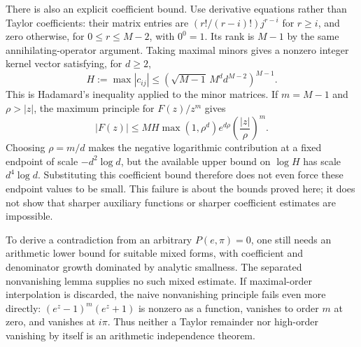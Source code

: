 \documentclass[11pt,a4paper]{article}
\numberwithin{equation}{section}
\begin{document}
There is also an explicit coefficient bound. Use derivative equations
rather than Taylor coefficients: their matrix entries are
$(r!/(r-i)!)j^{r-i}$ for $r\ge i$, and zero otherwise, for
$0\le r\le M-2$, with $0^0=1$. Its rank is $M-1$ by the same
annihilating-operator argument. Taking maximal minors gives a nonzero
integer kernel vector satisfying, for $d\ge2$,
\begin{equation}
 H:=\max|c_{ij}|
 \le\left(\sqrt{M-1}\,M^d d^{M-2}\right)^{M-1}.
\end{equation}
This is Hadamard's inequality applied to the minor matrices. If
$m=M-1$ and $\rho>|z|$, the maximum principle for $F(z)/z^m$ gives
\begin{equation}
 |F(z)|\le M H\max(1,\rho^d)e^{d\rho}
                   \left(\frac{|z|}{\rho}\right)^m.
\end{equation}
Choosing $\rho=m/d$ makes the negative logarithmic contribution at a
fixed endpoint of scale $-d^2\log d$, but the available upper bound on
$\log H$ has scale $d^4\log d$. Substituting this coefficient bound
therefore does not even force these endpoint values to be small. This
failure is about the bounds proved here; it does not show that sharper
auxiliary functions or sharper coefficient estimates are impossible.

To derive a contradiction from an arbitrary $P(e,\pi)=0$, one still
needs an arithmetic lower bound for suitable mixed forms, with
coefficient and denominator growth dominated by analytic smallness.
The separated nonvanishing lemma supplies no such mixed estimate.
If maximal-order interpolation is discarded, the naive nonvanishing
principle fails even more directly: $(e^z-1)^m(e^z+1)$ is nonzero as a
function, vanishes to order $m$ at zero, and vanishes at $i\pi$.
Thus neither a Taylor remainder nor high-order vanishing by itself is
an arithmetic independence theorem.
\end{document}
